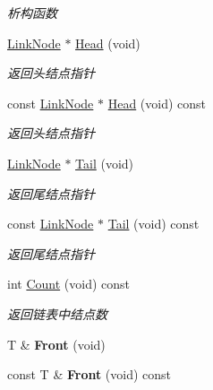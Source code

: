 \begin{DoxyCompactItemize}
\begin{DoxyCompactList}\small\item\em 析构函数 \end{DoxyCompactList}\item 
\hyperlink{class_util_1_1_link_list_t_1_1_link_node}{Link\-Node} $\ast$ \hyperlink{class_util_1_1_link_list_t_a1bce3005e2fa80505d554725aa39ea7b}{Head} (void)
\begin{DoxyCompactList}\small\item\em 返回头结点指针 \end{DoxyCompactList}\item 
const \hyperlink{class_util_1_1_link_list_t_1_1_link_node}{Link\-Node} $\ast$ \hyperlink{class_util_1_1_link_list_t_a0eacfdc2967ebc4398c256045b42c9e0}{Head} (void) const 
\begin{DoxyCompactList}\small\item\em 返回头结点指针 \end{DoxyCompactList}\item 
\hyperlink{class_util_1_1_link_list_t_1_1_link_node}{Link\-Node} $\ast$ \hyperlink{class_util_1_1_link_list_t_a1dc4db8985e3b8d4d3a70940cbaf91cd}{Tail} (void)
\begin{DoxyCompactList}\small\item\em 返回尾结点指针 \end{DoxyCompactList}\item 
const \hyperlink{class_util_1_1_link_list_t_1_1_link_node}{Link\-Node} $\ast$ \hyperlink{class_util_1_1_link_list_t_a3de4674fbd5e53c7d15234ecb6a94fcd}{Tail} (void) const 
\begin{DoxyCompactList}\small\item\em 返回尾结点指针 \end{DoxyCompactList}\item 
int \hyperlink{class_util_1_1_link_list_t_a67b0960b3562bf628e3dac416591193e}{Count} (void) const 
\begin{DoxyCompactList}\small\item\em 返回链表中结点数 \end{DoxyCompactList}\item 
\hypertarget{class_util_1_1_link_list_t_a1bc012ec7cd5c67ca0451d2106a21d68}{T \& {\bfseries Front} (void)}\label{class_util_1_1_link_list_t_a1bc012ec7cd5c67ca0451d2106a21d68}

\item 
\hypertarget{class_util_1_1_link_list_t_a43ce5d976e787777abf2cdd380eb43e8}{const T \& {\bfseries Front} (void) const }\label{class_util_1_1_link_list_t_a43ce5d976e787777abf2cdd380eb43e8}


\end{DoxyCompactItemize}
